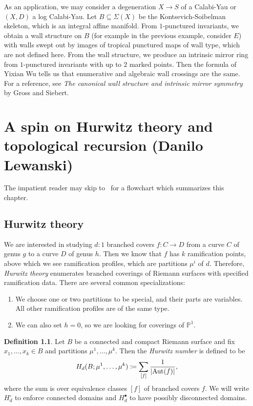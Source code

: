 \documentclass[leqno, openany]{memoir}
\theoremstyle{definition}
\newtheorem{defn}[thm]{Definition}
\theoremstyle{remark}
\theoremstyle{plain}
\theoremstyle{definition}
\theoremstyle{remark}
\renewcommand{\P}{\mathbb{P}}
\DeclareMathOperator{\Aut}{Aut}
\begin{document}
As an application, we may consider a degeneration $X \to S$ of a Calabi-Yau or $(X,D)$ a log Calabi-Yau. Let $B \subseteq \Sigma(X)$ be the Kontsevich-Soibelman skeleton, which is an integral affine manifold. From $1$-punctured invariants, we obtain a wall structure on $B$ (for example in the previous example, consider $E$) with walls swept out by images of tropical punctured maps of wall type, which are not defined here. From the wall structure, we produce an intrinsic mirror ring from $1$-punctured invariants with up to $2$ marked points. Then the formula of Yixian Wu tells us that enumerative and algebraic wall crossings are the same. For a reference, see \textit{The canonical wall structure and intrinsic mirror symmetry} by Gross and Siebert.

\chapter{A spin on Hurwitz theory and topological recursion (Danilo Lewanski)}
\label{cha:lewanski}

The impatient reader may skip to~ for a flowchart which summarizes this chapter.

\section{Hurwitz theory}
\label{sec:hurwitz}

We are interested in studying $d:1$ branched covers $f \colon C \to D$ from a curve $C$ of genus $g$ to a curve $D$ of genus $h$. Then we know that $f$ has $k$ ramification points, above which we see ramification profiles, which are partitions $\mu^i$ of $d$. Therefore, \textit{Hurwitz theory} enumerates branched coverings of Riemann surfaces with specified ramification data. There are several common specializations:
\begin{enumerate}
\item We choose one or two partitions to be special, and their parts are variables. All other ramification profiles are of the same type.
\item We can also set $h=0$, so we are looking for coverings of $\P^1$.
\end{enumerate}

\begin{defn}
  Let $B$ be a connected and compact Riemann surface and fix $x_1, \ldots, x_k \in B$ and partitions $\mu^1, \ldots, \mu^k$. Then the \textit{Hurwitz number} is defined to be
  \[ H_d(B; \mu^1, \ldots, \mu^k) \coloneqq \sum_{[f]} \frac{1}{\abs{\Aut(f)}}, \]
  where the sum is over equivalence classes $[f]$ of branched covers $f$. We will write $H_d^{\circ}$ to enforce connected domains and $H_d^{\bullet}$ to have possibly disconnected domains.
\end{defn}
\end{document}
